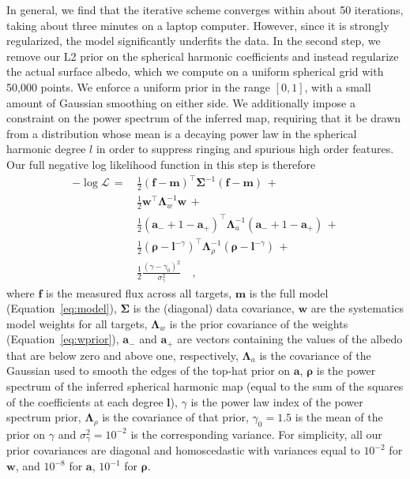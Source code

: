 \documentclass[modern]{aastex62}
\begin{document}
In general, we find that the iterative scheme converges within about 50 
iterations, taking about three minutes on a laptop computer. However, since it 
is strongly regularized, the model significantly
underfits the data. In the second step, we remove our L2 prior on the spherical
harmonic coefficients and instead regularize the actual surface albedo, which
we compute on a uniform spherical grid with 50,000 points. We enforce a 
uniform prior in the range $[0, 1]$, with a small amount of Gaussian smoothing on either 
side. We additionally impose a constraint on the power spectrum of the
inferred map, requiring that it be drawn from a distribution whose mean
is a decaying power law in the spherical harmonic degree $l$ in order
to suppress ringing and spurious high order features.
Our full negative log likelihood function in this step is therefore
%
\begin{align}
    \label{eq:nll}
    -\log\mathcal{L} \, = \, 
        &\frac{1}{2}(\mathbf{f} - \mathbf{m})^\top \boldsymbol{\Sigma}^{-1} (\mathbf{f} - \mathbf{m}) \, + \nonumber \\
        &\frac{1}{2}\mathbf{w}^\top \boldsymbol{\Lambda}_w^{-1} \mathbf{w} \, + \nonumber \\
        &\frac{1}{2}(\mathbf{a_-} + 1 - \mathbf{a_+})^\top \boldsymbol{\Lambda}_a^{-1} (\mathbf{a_-} + 1 - \mathbf{a_+}) \, + \nonumber \\
        &\frac{1}{2}(\boldsymbol{\rho} - \boldsymbol{l}^{-\gamma})^\top \boldsymbol{\Lambda}_\rho^{-1} (\boldsymbol{\rho} - \boldsymbol{l}^{-\gamma}) \, + \nonumber \\
        &\frac{1}{2} \frac{(\gamma - \gamma_0)^2}{\sigma_\gamma^2}
        \quad,
\end{align}
%
where $\mathbf{f}$ is the measured flux across all targets,
$\mathbf{m}$ is the full model (Equation~\ref{eq:model}),
$\boldsymbol{\Sigma}$ is the (diagonal) data covariance, 
$\mathbf{w}$ are the systematics model weights for all targets,
$\boldsymbol{\Lambda}_w$ is the prior covariance of the weights
(Equation~\ref{eq:wprior}), $\mathbf{a_-}$ and $\mathbf{a_+}$ are
vectors containing the values of the albedo that are below zero and above one, 
respectively, $\boldsymbol{\Lambda}_a$ is the covariance of the Gaussian
used to smooth the edges of the top-hat prior on $\mathbf{a}$,
$\boldsymbol{\rho}$ is the power spectrum of the inferred spherical harmonic map
(equal to the sum of the squares of the coefficients at each degree $\boldsymbol{l}$),
$\gamma$ is the power law index of the power spectrum prior, $\boldsymbol{\Lambda}_\rho$ is the
covariance of that prior, $\gamma_0 = 1.5$ is the mean of the prior on $\gamma$
and $\sigma_\gamma^2 = 10^{-2}$ is the corresponding variance.
%
For simplicity, all our prior covariances are diagonal and
homoscedastic with variances equal to $10^{-2}$ for $\mathbf{w}$, and
$10^{-8}$ for $\mathbf{a}$, $10^{-1}$ for $\mathbf{\rho}$.
\end{document}
